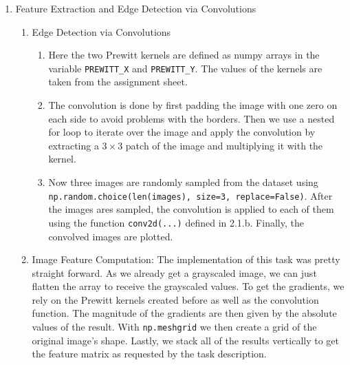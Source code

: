 \documentclass[
    a4paper,
    12pt,
    parskip=half,
]{scrarticle}
\begin{document}
\begin{enumerate}
    \item Feature Extraction and Edge Detection via Convolutions
    \begin{enumerate}[label=\theenumi.\arabic*.]
        \item Edge Detection via Convolutions
        \begin{enumerate}[label=\alph*)]
            \item Here the two Prewitt kernels are defined as numpy arrays in the variable \texttt{PREWITT\_X} and \texttt{PREWITT\_Y}.
            The values of the kernels are taken from the assignment sheet.
            \item The convolution is done by first padding the image with one zero on each side to avoid problems with the borders.
            Then we use a nested for loop to iterate over the image and apply the convolution by extracting  a \(3 \times 3\) patch of the image and multiplying it with the kernel.
            \item Now three images are randomly sampled from the dataset using \\ \texttt{np.random.choice(len(images), size=3, replace=False)}.
            After the images ares sampled, the convolution is applied to each of them using the function \texttt{conv2d(...)} defined in 2.1.b.
            Finally, the convolved images are plotted.
        \end{enumerate}
        \item Image Feature Computation:
        The implementation of this task was pretty straight forward. As we already get a grayscaled image, we can just flatten the array to receive the grayscaled values. To get the gradients, we rely on the Prewitt kernels created before as well as the convolution function. The magnitude of the gradients are then given by the absolute values of the result. With \texttt{np.meshgrid} we then create a grid of the original image's shape. Lastly, we stack all of the results vertically to get the feature matrix as requested by the task description.
    \end{enumerate}


\end{enumerate}
\end{document}
